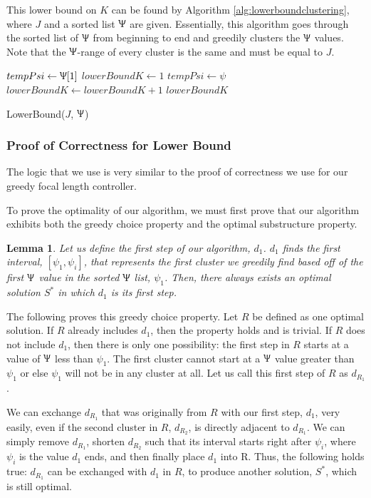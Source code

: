 \documentclass[conference]{IEEEtran}
\theoremstyle{plain}%
\newtheorem{lemma}[theorem]{Lemma}
\begin{document}
This lower bound on $K$ can be found by Algorithm \ref{alg:lowerboundclustering}, where $J$ and a sorted list $\Uppsi$ are given. Essentially, this algorithm goes through the sorted list of $\Uppsi$ from beginning to end and greedily clusters the $\Uppsi$ values. Note that the $\Uppsi$-range of every cluster is the same and must be equal to $J$.

\begin{algorithm}
\begin{algorithmic}[1]
\STATE $tempPsi \leftarrow \Uppsi[1]$
\STATE $lowerBoundK \leftarrow 1$
\FOR{$\psi \in \Uppsi$}
\STATE $tempPsi \leftarrow \psi$
\STATE $lowerBoundK \leftarrow lowerBoundK + 1$
\ENDIF
\ENDFOR
\RETURN $lowerBoundK$
\end{algorithmic}
\caption{LowerBound($J$, $\Uppsi$)} 
\label{alg:lowerboundclustering}
\end{algorithm}

\subsubsection{Proof of Correctness for Lower Bound}
The logic that we use is very similar to the proof of correctness we use for our greedy focal length controller.

To prove the optimality of our algorithm, we must first prove that our algorithm exhibits both the greedy choice property and the optimal substructure property.
\begin{lemma} %
Let us define the first step of our algorithm, $d_1$. $d_1$ finds the first interval, $[\psi_1, \psi_i]$, that represents the first cluster we greedily find based off of the first $\Uppsi$ value in the sorted $\Uppsi$ list, $\psi_1$. Then, there always exists an optimal solution $S^*$ in which $d_1$ is its first step.
\end{lemma}
The following proves this greedy choice property. Let $R$ be defined as one optimal solution. If $R$ already includes $d_1$, then the property holds and is trivial. If $R$ does not include $d_1$, then there is only one possibility: the first step in $R$ starts at a value of $\Uppsi$ less than $\psi_1$. The first cluster cannot start at a $\Uppsi$ value greater than $\psi_1$ or else $\psi_1$ will not be in any cluster at all. Let us call this first step of $R$ as $d_{R_1}$.

We can exchange $d_{R_1}$ that was originally from $R$ with our first step, $d_1$, very easily, even if the second cluster in $R$, $d_{R_2}$, is directly adjacent to $d_{R_1}$. We can simply remove $d_{R_1}$, shorten $d_{R_2}$ such that its interval starts right after $\psi_i$, where $\psi_i$ is the value $d_1$ ends, and then finally place $d_1$ into R. Thus, the following holds true: $d_{R_1}$ can be exchanged with $d_1$ in $R$, to produce another solution, $S^*$, which is still optimal.
\end{document}
